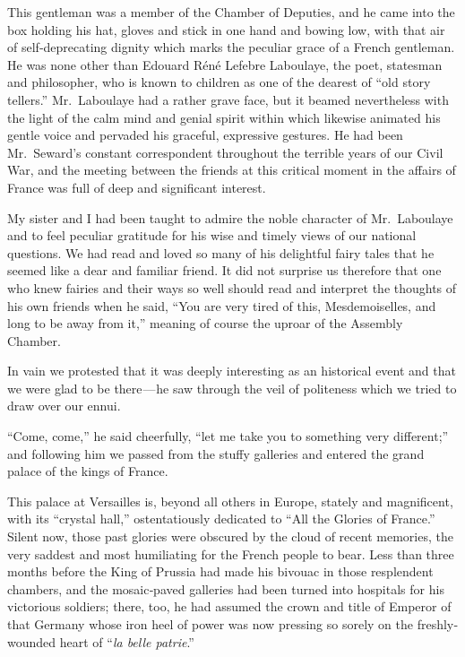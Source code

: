 \documentclass[12pt]{book}
\begin{document}
This gentleman was a member of the Chamber of Deputies, and he came into
the box holding his hat, gloves and stick in one hand and bowing low, with that air
of self‐deprecating dignity which marks the peculiar grace of a French gentleman.
He was none other than Edouard Réné Lefebre Laboulaye, the poet, statesman and
philosopher, who is known to children as one of the dearest of “old story tellers.”
Mr.~Laboulaye had a rather grave face, but it beamed nevertheless with the light
of the calm mind and genial spirit within which likewise animated his gentle
voice and pervaded his graceful, expressive gestures. He had been Mr.~Seward’s
constant correspondent throughout the terrible years of our Civil War, and the
meeting between the friends at this critical moment in the affairs of France was
full of deep and significant interest.

My sister and I had been taught to admire the noble character of Mr.~Laboulaye
and to feel peculiar gratitude for his wise and timely views of our national questions. We had read and loved so many of his delightful fairy tales that he seemed
like a dear and familiar friend. It did not surprise us therefore that one who knew
fairies and their ways so well should read and interpret the thoughts of his own
friends when he said, “You are very tired of this, Mesdemoiselles, and long to be
away from it,” meaning of course the uproar of the Assembly Chamber.

In vain we protested that it was deeply interesting as an historical event and
that we were glad to be there — he saw through the veil of politeness which we
tried to draw over our ennui.

“Come, come,” he said cheerfully, “let me take you to something very different;”
and following him we passed from the stuffy galleries and entered the grand palace
of the kings of France.

This palace at Versailles is, beyond all others in Europe, stately and magnificent,
with its “crystal hall,” ostentatiously dedicated to “All the Glories of France.” Silent
now, those past glories were obscured by the cloud of recent memories, the very
saddest and most humiliating for the French people to bear. Less than three
months before the King of Prussia had made his bivouac in those resplendent
chambers, and the mosaic‐paved galleries had been turned into hospitals for his
victorious soldiers; there, too, he had assumed the crown and title of Emperor
of that Germany whose iron heel of power was now pressing so sorely on the
freshly‐wounded heart of “{\it la belle patrie}.”
\end{document}
